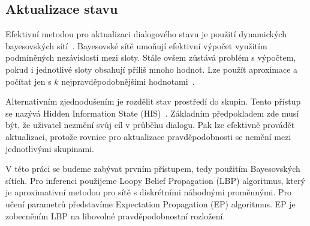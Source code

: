 \subsection{Aktualizace stavu}

Efektivní metodou pro aktualizaci dialogového stavu je použití dynamických bayesovských sítí~\cite{thomson2008bayesian}.
Bayesovské sítě umoňují efektivní výpočet využitím podmíněných nezávislostí mezi sloty.
Stále ovšem zůstává problém s výpočtem, pokud i jednotlivé sloty obsahují příliš mnoho hodnot.
Lze použít aproximace a počítat jen s $k$ nejpravděpodobnějšími hodnotami~\cite{thomson2010bayesian}.

Alternativním zjednodušením je rozdělit stav prostředí do skupin. 
Tento přístup se nazývá Hidden Information State (HIS)~\cite{young2010hidden}.
Základním předpokladem zde musí být, že uživatel nezmění svůj cíl v průběhu dialogu.
Pak lze efektivně provádět aktualizaci, protože rovnice pro aktualizace pravděpodobnosti se nemění mezi jednotlivými skupinami.

V této práci se budeme zabývat prvním přístupem, tedy použitím Bayesovských sítích.
Pro inferenci použijeme Loopy Belief Propagation (LBP) algoritmus, který je aproximativní metodou pro sítě s diskrétními náhodnými proměnnými.
Pro učení parametrů představíme Expectation Propagation (EP) algoritmus.
EP je zobecněním LBP na libovolné pravděpodobnostní rozložení.
